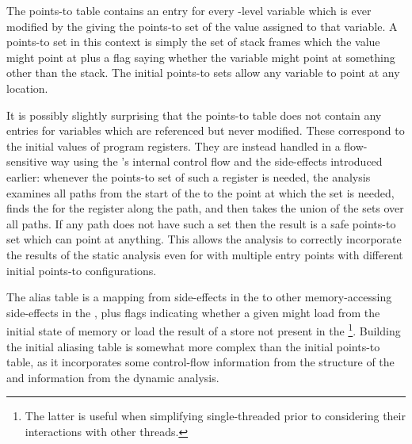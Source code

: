 The points-to table contains an entry for every {\StateMachine}-level
variable which is ever modified by the {\StateMachine} giving the
points-to set of the value assigned to that variable.  A points-to set
in this context is simply the set of stack frames which the value
might point at plus a flag saying whether the variable might point at
something other than the stack.  The initial points-to sets allow any
variable to point at any location.

It is possibly slightly surprising that the points-to table does not
contain any entries for variables which are referenced but never
modified.  These correspond to the initial values of program
registers.  They are instead handled in a flow-sensitive way using the
{\StateMachine}'s internal control flow and the 
side-effects introduced earlier: whenever the points-to set of such a
register is needed, the analysis examines all paths from the start of
the {\StateMachine} to the point at which the set is needed, finds the
 for the register along the path, and then takes the
union of the sets over all paths.  If any path does not have such a
set then the result is a safe points-to set which can point at
anything.  This allows the analysis to correctly incorporate the
results of the static analysis even for {\StateMachines} with multiple
entry points with different initial points-to configurations.
  

The alias table is a mapping from  side-effects in the
{\StateMachine} to other memory-accessing side-effects in the
{\StateMachine}, plus flags indicating whether a given might load from
the initial state of memory or load the result of a store not present
in the {\StateMachine}\footnote{The latter is useful when simplifying
  single-threaded {\StateMachines} prior to considering their
  interactions with other threads.}.  Building the initial aliasing
table is somewhat more complex than the initial points-to table, as it
incorporates some control-flow information from the structure of the
{\StateMachine} and information from the dynamic analysis.

